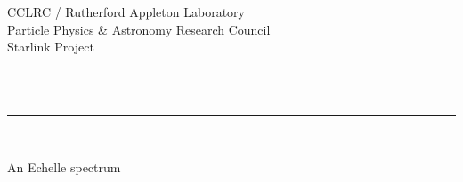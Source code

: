 \begin{latex}
   CCLRC / {\sc Rutherford Appleton Laboratory} \hfill {\bf \stardocname}\\
   {\large Particle Physics \& Astronomy Research Council}\\
   {\large Starlink Project\\}
   {\large \stardoccategory\ \stardocnumber}
   \begin{flushright}
   \stardocauthors\\
   \stardocdate
   \end{flushright}
   \vspace{-4mm}
   \rule{\textwidth}{0.5mm}
   \vspace{5mm}
   \begin{center}
   {\Huge\bf  \stardoctitle \\ [2.5ex]}
   \end{center}
   \vspace{5mm}

   \begin{center}
   \leavevmode\epsfysize=120mm

   An Echelle spectrum
   \end{center}

\end{latex}

